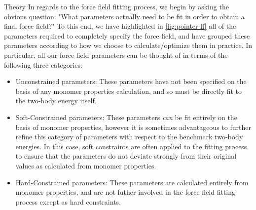 \begin{subsection}{Theory}
In regards to the force field fitting process, we begin by asking the obvious
question: "What parameters actually need to be fit in order to obtain a final
force field?" To this end, we have highlighted in \cref{fig:pointer-ff} all
of the parameters required to completely specify the \mastiff force field, and
have grouped these parameters according to how we choose to calculate/optimize
them in practice. In particular, all our force field parameters can be thought
of in terms of the following three categories:
%
\begin{itemize}
\item \textcolor{fit}{Unconstrained} parameters: These parameters have not
been specified on the basis of any monomer properties calculation, and so must
be directly fit to the two-body energy itself. 
%
\item \textcolor{cfit}{Soft-Constrained} parameters: These parameters
\emph{can} be fit entirely on the basis of monomer properties, however it is
sometimes advantageous to further refine this category of parameters with respect to the
benchmark two-body energies. In this case, soft
constraints\cite{Misquitta2016} are often applied to
the fitting process to ensure that the parameters do not deviate strongly from
their original values as calculated from monomer properties.
%
\item \textcolor{mon}{Hard-Constrained} parameters: These parameters are calculated
entirely from monomer properties, and are not futher involved in the force
field fitting process except as hard constraints.
\end{itemize}


\end{subsection}
